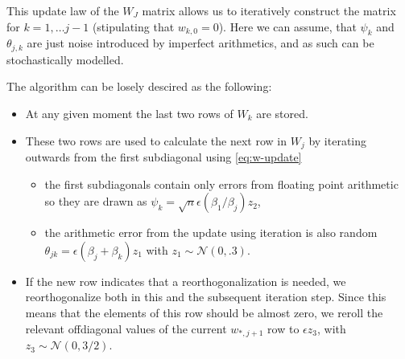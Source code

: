 \documentclass{article}
\begin{document}
	 This update law of the $W_J$ matrix allows us to iteratively construct the matrix for $k=1,\dots j-1$ (stipulating that $w_{k,0} = 0$). Here we can assume, that $\psi_k$ and $\theta_{j,k}$ are just noise introduced by imperfect arithmetics, and as such can be stochastically modelled.
	 
	 The algorithm can be losely descired as the following:
	 \begin{itemize}
	 	\item At any given moment the last two rows of $W_k$ are stored.
	 	\item These two rows are used to calculate the next row in $W_j$ by iterating outwards from the first subdiagonal using \autoref{eq:w-update}
	 	\begin{itemize}
	 		\item the first subdiagonals contain only errors from floating point arithmetic so they are drawn as $\psi_{k}=\sqrt{n}\epsilon(\beta_{1}/\beta_{j}) z_2$,
	 		\item the arithmetic error from the update using iteration is also random $\theta_{jk}=\epsilon(\beta_{j}+\beta_{k})z_1$ with $z_1\sim \mathcal{N}(0,.3)$.
	 	\end{itemize}
	 	\item If the new row indicates that a reorthogonalization is needed, we reorthogonalize both in this and the subsequent iteration step. Since this means that the elements of this row should be almost zero, we reroll the relevant offdiagonal values of the current $w_{*,j+1}$ row to $\epsilon z_3$, with $z_3\sim\mathcal{N}(0,3/2)$.
	 \end{itemize}
	 
\end{document}
